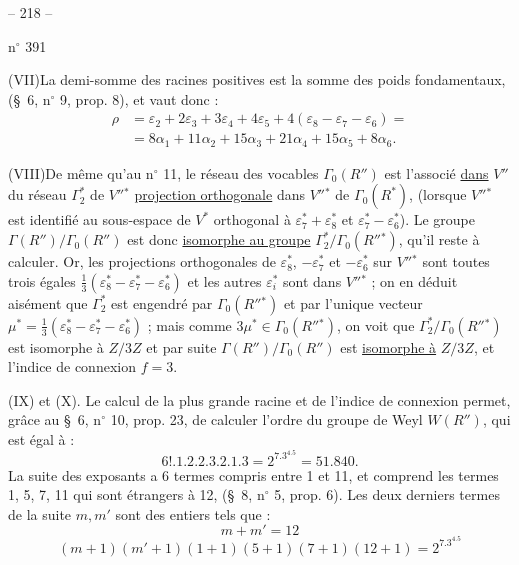 
\begin{center}-- 218 --\end{center}
\hfill n$^{\circ}$ 391

(VII)\quad La demi-somme des racines positives est la somme des poids fondamentaux,
(\S\ 6, n$^{\circ}$ 9, prop. 8), et vaut donc :
\[
\begin{aligned}
\rho&=\varepsilon_2+2\varepsilon_3+3\varepsilon_4+4\varepsilon_5+
4(\varepsilon_8-\varepsilon_7-\varepsilon_6)=\\
&=8\alpha_1+11\alpha_2+15\alpha_3+21\alpha_4+15\alpha_5+8\alpha_6.
\end{aligned}
\]

(VIII)\quad De même qu'au n$^{\circ}$ 11, le réseau des vocables $\Gamma_0(R'')$ est l'associé
\uline{dans} $V''$ du réseau $\Gamma_2^*$ de $V''{}^*$ \uline{projection orthogonale} dans $V''{}^*$ de $\Gamma_0(R^*)$,
(lorsque $V''{}^*$ est identifié au sous-espace de $V^*$ orthogonal à
$\varepsilon_7^*+\varepsilon_8^*$ et $\varepsilon_7^*-\varepsilon_6^*$).
Le groupe $\Gamma(R'')/\Gamma_0(R'')$ est donc \uline{isomorphe au groupe} $\Gamma_2^*/\Gamma_0(R''{}^*)$, qu'il reste
à calculer. Or, les projections orthogonales de $\varepsilon_8^*$, $-\varepsilon_7^*$ et $-\varepsilon_6^*$ sur $V''{}^*$ sont
toutes trois égales $\frac13(\varepsilon_8^*-\varepsilon_7^*-\varepsilon_6^*)$ et les autres $\varepsilon_i^*$ sont dans $V''{}^*$ ; on en
déduit aisément que $\Gamma_2^*$ est engendré par $\Gamma_0(R''{}^*)$ et par l'unique vecteur
$\mu^*=\frac13(\varepsilon_8^*-\varepsilon_7^*-\varepsilon_6^*)$ ; mais comme $3\mu^*\in\Gamma_0(R''{}^*)$, on voit que
$\Gamma_2^*/\Gamma_0(R''{}^*)$
est isomorphe à $Z/3Z$ et par suite $\Gamma(R'')/\Gamma_0(R'')$ est \uline{isomorphe à} $Z/3Z$, et
l'indice de connexion $f=3$.

(IX) et (X). Le calcul de la plus grande racine et de l'indice de connexion
permet, grâce au \S\ 6, n$^{\circ}$ 10, prop. 23, de calculer l'ordre du groupe de Weyl
$W(R'')$, qui est égal à :
\[
6!.1.2.2.3.2.1.3=2^7.3^4.5=51.840.
\]
La suite des exposants a 6 termes compris entre 1 et 11, et comprend les termes
1, 5, 7, 11 qui sont étrangers à 12, (\S\ 8, n$^{\circ}$ 5, prop. 6). Les deux derniers
termes de la suite $m,m'$ sont des entiers tels que :
\[
m+m'=12
\]
\[
(m+1)(m'+1)(1+1)(5+1)(7+1)(12+1)=2^7.3^4.5
\]

